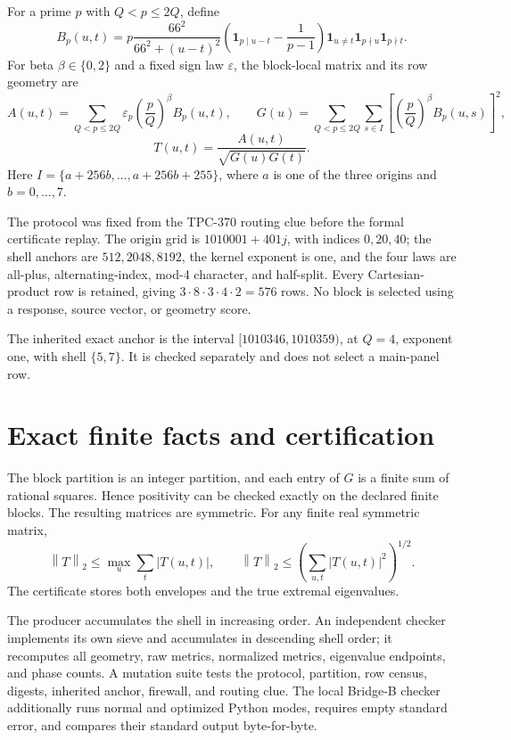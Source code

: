 \documentclass[10pt]{article}
\newcommand{\opnorm}[1]{\left\lVert #1\right\rVert_{2}}
\begin{document}
For a prime \(p\) with \(Q<p\leq 2Q\), define
\[
 B_p(u,t)=p\frac{66^2}{66^2+(u-t)^2}
 \left(\mathbf 1_{p\mid u-t}-\frac{1}{p-1}\right)
 \mathbf 1_{u\ne t}\mathbf 1_{p\nmid u}\mathbf 1_{p\nmid t}.
\]
For beta \(\beta\in\{0,2\}\) and a fixed sign law \(\varepsilon\), the
block-local matrix and its row geometry are
\[
 A(u,t)=\sum_{Q<p\leq2Q}\varepsilon_p\left(\frac pQ\right)^\beta B_p(u,t),
 \qquad
 G(u)=\sum_{Q<p\leq2Q}\sum_{s\in I}
 \left[\left(\frac pQ\right)^\beta B_p(u,s)\right]^2,
\]
\[
 T(u,t)=\frac{A(u,t)}{\sqrt{G(u)G(t)}}.
\]
Here \(I=\{a+256b,\ldots,a+256b+255\}\), where \(a\) is one of the
three origins and \(b=0,\ldots,7\).

The protocol was fixed from the TPC-370 routing clue before the formal
certificate replay.  The origin grid is \(1010001+401j\), with indices
\(0,20,40\); the shell anchors are \(512,2048,8192\), the kernel exponent is
one, and the four laws are all-plus, alternating-index, mod-4 character, and
half-split.  Every Cartesian-product row is retained, giving
\(3\cdot8\cdot3\cdot4\cdot2=576\) rows.  No block is selected using a
response, source vector, or geometry score.

The inherited exact anchor is the interval \([1010346,1010359)\), at \(Q=4\),
exponent one, with shell \(\{5,7\}\).  It is checked separately and does not
select a main-panel row.

\section{Exact finite facts and certification}

The block partition is an integer partition, and each entry of \(G\) is a
finite sum of rational squares.  Hence positivity can be checked exactly on
the declared finite blocks.  The resulting matrices are symmetric.  For any
finite real symmetric matrix,
\[
 \opnorm{T}\leq \max_u\sum_t|T(u,t)|,
 \qquad
 \opnorm{T}\leq \left(\sum_{u,t}|T(u,t)|^2\right)^{1/2}.
\]
The certificate stores both envelopes and the true extremal eigenvalues.

The producer accumulates the shell in increasing order.  An independent
checker implements its own sieve and accumulates in descending shell order;
it recomputes all geometry, raw metrics, normalized metrics, eigenvalue
endpoints, and phase counts.  A mutation suite tests the protocol, partition,
row census, digests, inherited anchor, firewall, and routing clue.  The local
Bridge-B checker additionally runs normal and optimized Python modes, requires
empty standard error, and compares their standard output byte-for-byte.
\end{document}
